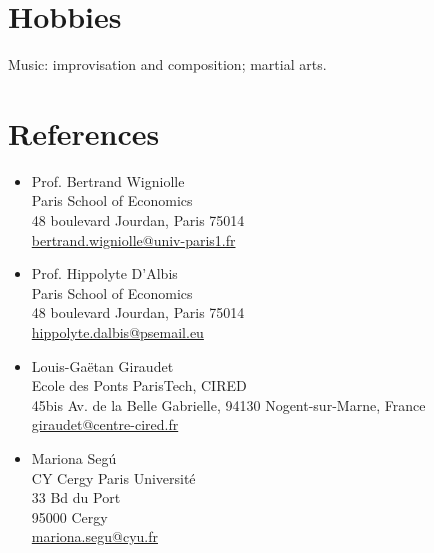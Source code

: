 \documentclass[letterpaper,11pt]{article}
\begin{document}
\section*{Hobbies}
Music: improvisation and composition; martial arts.

\section*{References}
\begin{itemize}[leftmargin=*]
    \item Prof. Bertrand Wigniolle\\
    Paris School of Economics\\
    48 boulevard Jourdan, Paris 75014\\
    \href{mailto:Bertrand.Wigniolle@univ-paris1.fr}{bertrand.wigniolle@univ-paris1.fr}

    \item Prof. Hippolyte D'Albis\\
    Paris School of Economics\\
    48 boulevard Jourdan, Paris 75014\\
    \href{mailto:hippolyte.dalbis@psemail.eu}{hippolyte.dalbis@psemail.eu}

    \item Louis-Ga\"{e}tan Giraudet\\
    Ecole des Ponts ParisTech, CIRED\\
    45bis Av. de la Belle Gabrielle, 94130 Nogent-sur-Marne, France\\
    \href{mailto:giraudet@centre-cired.fr}{giraudet@centre-cired.fr}

    \item Mariona Seg\'{u}\\
CY Cergy Paris Universit\'{e}  \\33 Bd du Port \\95000 Cergy\\
\href{mailto:mariona.segu@cyu.fr}{mariona.segu@cyu.fr}
\end{itemize}
\end{document}
